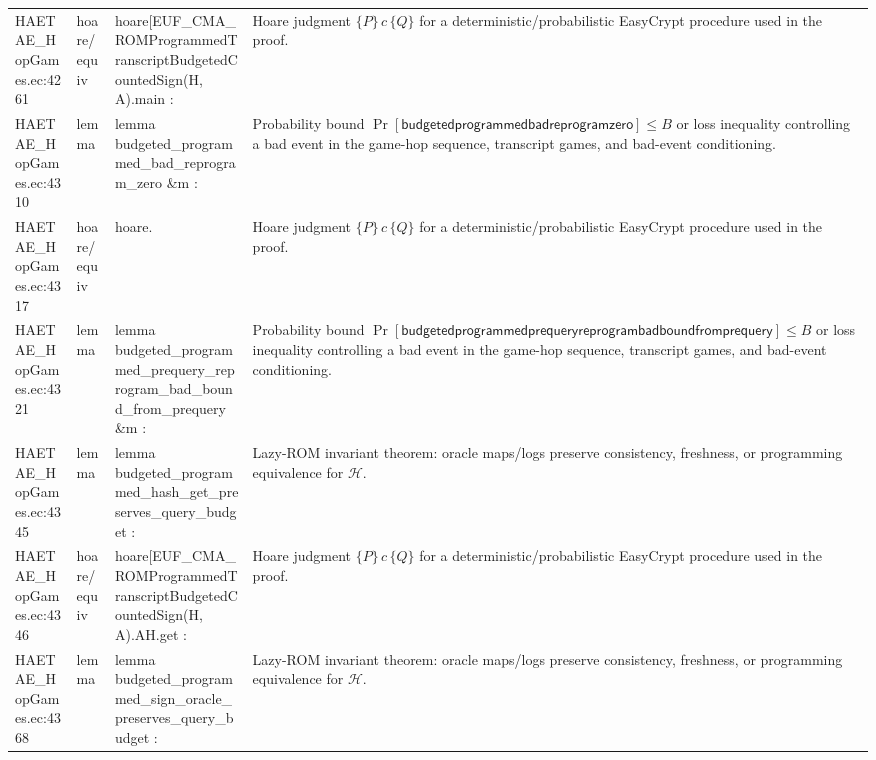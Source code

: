 \documentclass[10pt]{article}
\begin{document}
\begin{longtable}{L{0.11\textwidth}L{0.055\textwidth}L{0.385\textwidth}L{0.41\textwidth}}
HAETAE\_\allowbreak{}HopGames.\allowbreak{}ec:\allowbreak{}4261 & hoare/equiv & {\ttfamily\scriptsize hoare[EUF\_\allowbreak{}CMA\_\allowbreak{}ROMProgrammedTranscriptBudgetedCountedSign(H, A).main :} & Hoare judgment $\{P\}\,c\,\{Q\}$ for a deterministic/probabilistic EasyCrypt procedure used in the proof. \\
HAETAE\_\allowbreak{}HopGames.\allowbreak{}ec:\allowbreak{}4310 & lemma & {\ttfamily\scriptsize lemma budgeted\_\allowbreak{}programmed\_\allowbreak{}bad\_\allowbreak{}reprogram\_\allowbreak{}zero \&m :} & Probability bound $\Pr[\mathsf{budgetedprogrammedbadreprogramzero}]\le B$ or loss inequality controlling a bad event in the game-hop sequence, transcript games, and bad-event conditioning. \\
HAETAE\_\allowbreak{}HopGames.\allowbreak{}ec:\allowbreak{}4317 & hoare/equiv & {\ttfamily\scriptsize hoare.} & Hoare judgment $\{P\}\,c\,\{Q\}$ for a deterministic/probabilistic EasyCrypt procedure used in the proof. \\
HAETAE\_\allowbreak{}HopGames.\allowbreak{}ec:\allowbreak{}4321 & lemma & {\ttfamily\scriptsize lemma budgeted\_\allowbreak{}programmed\_\allowbreak{}prequery\_\allowbreak{}reprogram\_\allowbreak{}bad\_\allowbreak{}bound\_\allowbreak{}from\_\allowbreak{}prequery \&m :} & Probability bound $\Pr[\mathsf{budgetedprogrammedprequeryreprogrambadboundfromprequery}]\le B$ or loss inequality controlling a bad event in the game-hop sequence, transcript games, and bad-event conditioning. \\
HAETAE\_\allowbreak{}HopGames.\allowbreak{}ec:\allowbreak{}4345 & lemma & {\ttfamily\scriptsize lemma budgeted\_\allowbreak{}programmed\_\allowbreak{}hash\_\allowbreak{}get\_\allowbreak{}preserves\_\allowbreak{}query\_\allowbreak{}budget :} & Lazy-ROM invariant theorem: oracle maps/logs preserve consistency, freshness, or programming equivalence for $\mathcal H$. \\
HAETAE\_\allowbreak{}HopGames.\allowbreak{}ec:\allowbreak{}4346 & hoare/equiv & {\ttfamily\scriptsize hoare[EUF\_\allowbreak{}CMA\_\allowbreak{}ROMProgrammedTranscriptBudgetedCountedSign(H, A).AH.get :} & Hoare judgment $\{P\}\,c\,\{Q\}$ for a deterministic/probabilistic EasyCrypt procedure used in the proof. \\
HAETAE\_\allowbreak{}HopGames.\allowbreak{}ec:\allowbreak{}4368 & lemma & {\ttfamily\scriptsize lemma budgeted\_\allowbreak{}programmed\_\allowbreak{}sign\_\allowbreak{}oracle\_\allowbreak{}preserves\_\allowbreak{}query\_\allowbreak{}budget :} & Lazy-ROM invariant theorem: oracle maps/logs preserve consistency, freshness, or programming equivalence for $\mathcal H$. \\

\end{longtable}
\end{document}
